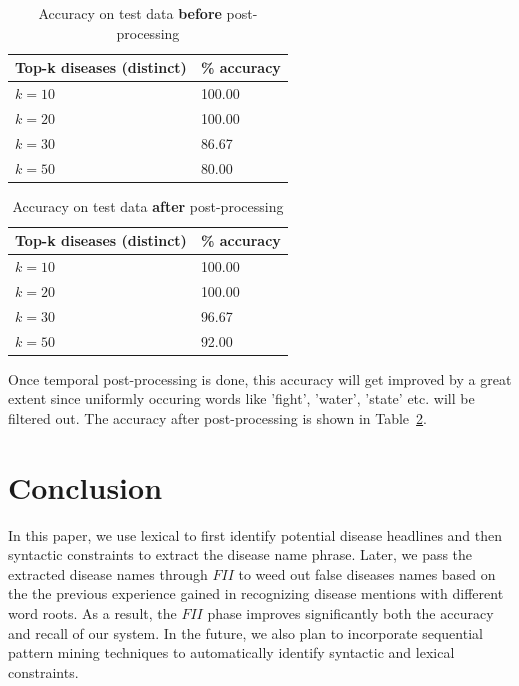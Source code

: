 \documentclass{article}
\begin{document}
\begin{table}[h]
  \caption{Accuracy on test data \textbf{before} post-processing}
  \centering
  \begin{tabular}{|l|l|} \hline
  \label{tab:acc-pre}
  \textbf{Top-k diseases (distinct)} & \textbf{\% accuracy} \\ \hline
  $k = 10$  & 100.00 \\ \hline  
  $k = 20$  & 100.00 \\ \hline  
  $k = 30$  & 86.67 \\ \hline  
  $k = 50$  & 80.00 \\ \hline  
  \end{tabular}
\end{table}
\vspace{-15pt}
\begin{table}[h!]
  \caption{Accuracy on test data \textbf{after} post-processing}
  \centering
  \begin{tabular}{|l|l|} \hline
  \label{tab:acc-post}
  \textbf{Top-k diseases (distinct)} & \textbf{\% accuracy} \\ \hline
  $k = 10$  & 100.00 \\ \hline  
  $k = 20$  & 100.00 \\ \hline  
  $k = 30$  & 96.67 \\ \hline  
  $k = 50$  & 92.00 \\ \hline  
  \end{tabular}
\end{table}

Once temporal post-processing is done, this accuracy will get improved by a great extent since uniformly occuring words like 'fight', 'water', 'state' etc. will be filtered out. The accuracy after post-processing is shown in Table~\ref{tab:acc-post}.
 
 
\section{Conclusion}
In this paper, we use lexical to first identify potential disease headlines and then syntactic constraints to extract the disease name phrase. Later, we pass the extracted disease names through $FII$ to weed out false diseases names based on the the previous experience gained in recognizing disease mentions with different word roots. As a result, the $FII$ phase improves significantly both the accuracy and recall of our system. In the future, we also plan to incorporate sequential pattern mining techniques to automatically identify syntactic and lexical constraints.  



\end{document}
